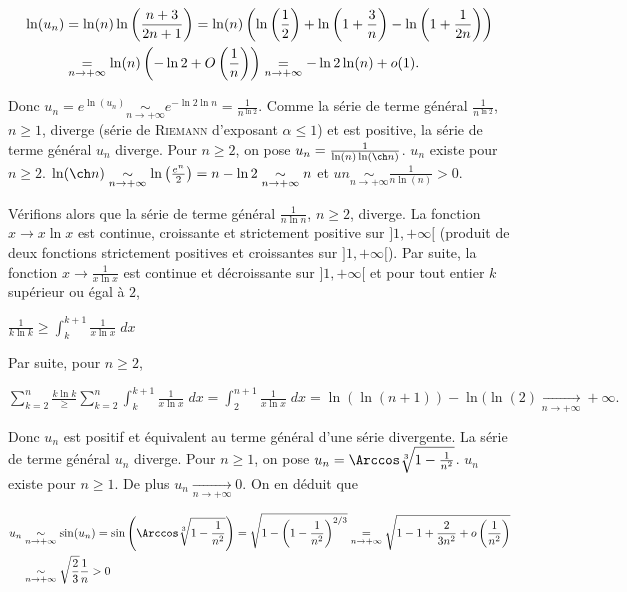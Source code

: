 {{\begin{align*}\ensuremath
\ln(u_n)&=\ln(n)\ln\left(\frac{n+3}{2n+1}\right) =\ln(n)\left(\ln\left(\frac{1}{2}\right)+\ln\left(1+\frac{3}{n}\right) -\ln\left(1+\frac{1}{2n}\right)\right)\\
 &\underset{n\rightarrow+\infty}{=}\ln(n)\left(-\ln2+O\left(\frac{1}{n}\right)\right)\underset{n\rightarrow+\infty}{=}-\ln2\ln(n)+o(1).
\end{align*}

Donc $u_n=e^{\ln(u_n)}\underset{n\rightarrow+\infty}{\sim}e^{-\ln2\ln n}=\frac{1}{n^{\ln2}}$.  Comme la série de terme général $\frac{1}{n^{\ln 2}}$, $n\geqslant1$, diverge (série de \textsc{Riemann} d'exposant $\alpha\leqslant1$) et est positive, la série de terme général $u_n$ diverge.
Pour $n\geqslant2$, on pose $u_n=\frac{1}{\ln(n)\ln(\ch n)}$. $u_n$ existe pour $n\geqslant2$. $\ln(\ch n)\underset{n\rightarrow+\infty}{\sim}\ln\left(\frac{e^n}{2}\right)=n -\ln2\underset{n\rightarrow+\infty}{\sim}n$ et $un\underset{n\rightarrow+\infty}{\sim}\frac{1}{n\ln(n)}>0$.

Vérifions alors que la série de terme général $\frac{1}{n\ln n}$, $n\geqslant2$, diverge. La fonction $x\rightarrow x\ln x$ est continue, croissante et strictement positive sur $]1,+\infty[$ (produit de deux fonctions strictement positives et croissantes sur $]1,+\infty[$). Par suite, la fonction $x\rightarrow\frac{1}{x\ln x}$ est continue et décroissante sur $]1,+\infty[$ et pour tout entier $k$ supérieur ou égal à $2$, 

\begin{center}
$\frac{1}{k\ln k}\geqslant\int_{k}^{k+1}\frac{1}{x\ln x}\;dx$
\end{center}

Par suite, pour $n\geqslant2$, 

\begin{center}
$\sum_{k=2}^{n}\frac{k\ln k}\geqslant\sum_{k=2}^{n}\int_{k}^{k+1}\frac{1}{x\ln x}\;dx=\int_{2}^{n+1}\frac{1}{x\ln x}\;dx=\ln(\ln(n+1)) -\ln(\ln(2)\underset{n\rightarrow+\infty}{\rightarrow}+\infty.$
\end{center}

Donc $u_n$ est positif et équivalent au terme général d'une série divergente. La série de terme général $u_n$ diverge.
Pour $n\geqslant1$, on pose $u_n=\Arccos\sqrt[3]{1-\frac{1}{n^2}}$. $u_n$ existe pour $n\geqslant 1$. De plus $u_n\underset{n\rightarrow+\infty}{\rightarrow}0$. On en déduit que 

\begin{align*}\ensuremath
u_n&\underset{n\rightarrow+\infty}{\sim}\sin(u_n)=\sin\left(\Arccos\sqrt[3]{1-\frac{1}{n^2}}\right) =\sqrt{1-\left(1-\frac{1}{n^2}\right)^{2/3}}\underset{n\rightarrow+\infty}{=}\sqrt{1-1+\frac{2}{3n^2}+o\left(\frac{1}{n^2}\right)}\\
 &\underset{n\rightarrow+\infty}{\sim}\sqrt{\frac{2}{3}}\frac{1}{n}>0
\end{align*}

}}
